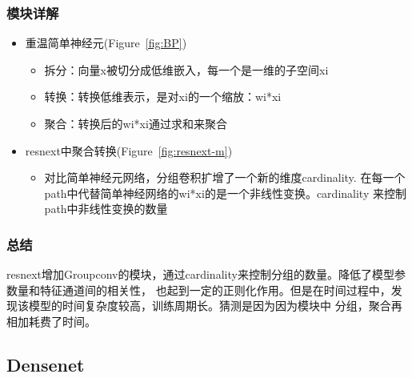 \documentclass{article}
\begin{document}
\begin{CJK}{UTF8}{gbsn}
\subsubsection{模块详解}
    \begin{itemize}
        \begin{figure}[!ht] 
            \centering
            \hfill 
            \caption{简单神经元和resnext模块的对比} 
            \label{fig:coontrast} 
            \end{figure}
        \item 重温简单神经元(Figure~\ref{fig:BP})
            \begin{itemize}
                我们应该知道，如上述的简单神经元，输出的是wi乘以xi的总和。上述操作
                可以和重新组合成拆分，转换和聚合的过程。
                \item 拆分：向量x被切分成低维嵌入，每一个是一维的子空间xi
                \item 转换：转换低维表示，是对xi的一个缩放：wi*xi
                \item 聚合：转换后的wi*xi通过求和来聚合
            \end{itemize}
        \item resnext中聚合转换(Figure~\ref{fig:resnext-m})
            \begin{itemize}
                \item 对比简单神经元网络，分组卷积扩增了一个新的维度cardinality.
                在每一个path中代替简单神经网络的wi*xi的是一个非线性变换。cardinality
                来控制path中非线性变换的数量
            \end{itemize}
    \end{itemize}


\subsubsection{总结}
resnext增加Groupconv的模块，通过cardinality来控制分组的数量。降低了模型参数量和特征通道间的相关性，
也起到一定的正则化作用。但是在时间过程中，发现该模型的时间复杂度较高，训练周期长。猜测是因为因为模块中
分组，聚合再相加耗费了时间。


\subsection{Densenet}

\end{CJK}
\end{document}
